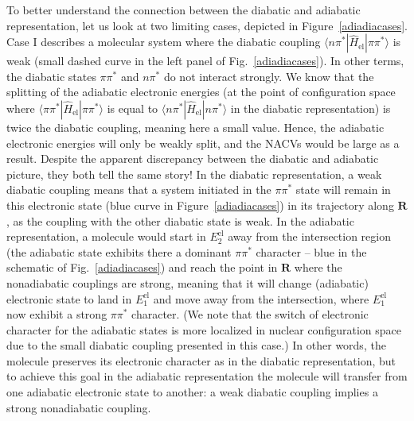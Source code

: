 \documentclass[9pt,bestpractices]{livecoms}
\begin{document}
To better understand the connection between the diabatic and adiabatic representation, let us look at two limiting cases, depicted in Figure~\ref{adiadiacases}. Case I describes a molecular system where the diabatic coupling $\langle n\pi^\ast | \hat{H}_{\text{el}} | \pi\pi^\ast\rangle$ is weak (small dashed curve in the left panel of Fig.~\ref{adiadiacases}). In other terms, the diabatic states $\pi\pi^\ast$ and $n\pi^\ast$ do not interact strongly. We know that the splitting of the adiabatic electronic energies (at the point of configuration space where $\langle \pi\pi^\ast | \hat{H}_{\text{el}} | \pi\pi^\ast\rangle$ is equal to $\langle n\pi^\ast | \hat{H}_{\text{el}} | n\pi^\ast\rangle$ in the diabatic representation) is twice the diabatic coupling, meaning here a small value. Hence, the adiabatic electronic energies will only be weakly split, and the NACVs would be large as a result. Despite the apparent discrepancy between the diabatic and adiabatic picture, they both tell the same story! In the diabatic representation, a weak diabatic coupling means that a system initiated in the $\pi\pi^\ast$ state will remain in this electronic state (blue curve in Figure~\ref{adiadiacases}) in its trajectory along $\mathbf{R}$, as the coupling with the other diabatic state is weak. In the adiabatic representation, a molecule would start in $E_2^{\text{el}}$ away from the intersection region (the adiabatic state exhibits there a dominant $\pi\pi^\ast$ character -- blue in the schematic of Fig.~\ref{adiadiacases}) and reach the point in $\mathbf{R}$ where the nonadiabatic couplings are strong, meaning that it will change (adiabatic) electronic state to land in $E_1^{\text{el}}$ and move away from the intersection, where $E_1^{\text{el}}$ now exhibit a strong $\pi\pi^\ast$ character. (We note that the switch of electronic character for the adiabatic states is more localized in nuclear configuration space due to the small diabatic coupling presented in this case.)  In other words, the molecule preserves its electronic character as in the diabatic representation, but to achieve this goal in the adiabatic representation the molecule will transfer from one adiabatic electronic state to another: a weak diabatic coupling implies a strong nonadiabatic coupling.
\end{document}
